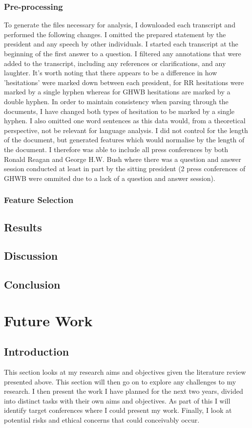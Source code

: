 \documentclass[10pt, letterpaper, twoside, openany]{book}
\begin{document}
\subsection{Pre-processing}
To generate the files necessary for analysis, I downloaded each transcript and performed the following changes. I omitted the prepared statement by the president and any speech by other individuals. I started each transcript at the beginning of the first answer to a question. I filtered any annotations that were added to the transcript, including any references or clarifications, and any laughter. It's worth noting that there appears to be a difference in how 'hesitations' were marked down between each president, for RR hesitations were marked by a single hyphen whereas for GHWB hesitations are marked by a double hyphen. In order to maintain consistency when parsing through the documents, I have changed both types of hesitation to be marked by a single hyphen. I also omitted one word sentences as this data would, from a theoretical perspective, not be relevant for language analysis. I did not control for the length of the document, but generated features which would normalise by the length of the document. I therefore was able to include all press conferences by both Ronald Reagan and George H.W. Bush where there was a question and answer session conducted at least in part by the sitting president (2 press conferences of GHWB were ommited due to a lack of a question and answer session).
\subsection{Feature Selection}
\section{Results}
\section{Discussion}
\section{Conclusion}



\chapter{Future Work}
\section{Introduction}
This section looks at my research aims and objectives given the literature review presented above. This section will then go on to explore any challenges to my research. I then present the work I have planned for the next two years, divided into distinct tasks with their own aims and objectives. As part of this I will identify target conferences where I could present my work. Finally, I look at potential risks and ethical concerns that could conceivably occur.
\end{document}
